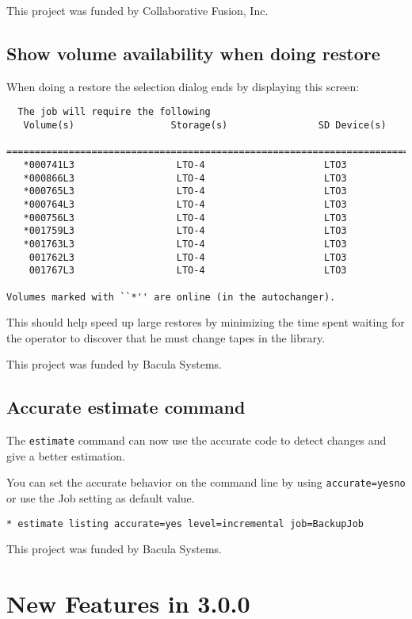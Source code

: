 This project was funded by Collaborative Fusion, Inc.

\section{Show volume availability when doing restore}

When doing a restore the selection dialog ends by displaying this
screen:

\begin{verbatim}
  The job will require the following
   Volume(s)                 Storage(s)                SD Device(s)
   ===========================================================================
   *000741L3                  LTO-4                     LTO3 
   *000866L3                  LTO-4                     LTO3 
   *000765L3                  LTO-4                     LTO3 
   *000764L3                  LTO-4                     LTO3 
   *000756L3                  LTO-4                     LTO3 
   *001759L3                  LTO-4                     LTO3 
   *001763L3                  LTO-4                     LTO3 
    001762L3                  LTO-4                     LTO3 
    001767L3                  LTO-4                     LTO3 

Volumes marked with ``*'' are online (in the autochanger).
\end{verbatim}

This should help speed up large restores by minimizing the time spent
waiting for the operator to discover that he must change tapes in the library.

This project was funded by Bacula Systems.

\section{Accurate estimate command}

The \texttt{estimate} command can now use the accurate code to detect changes
and give a better estimation.

You can set the accurate behavior on the command line by using
\texttt{accurate=yes\vb{}no} or use the Job setting as default value.

\begin{verbatim}
* estimate listing accurate=yes level=incremental job=BackupJob
\end{verbatim}

This project was funded by Bacula Systems.

\chapter{New Features in 3.0.0}
\label{NewFeaturesChapter}

